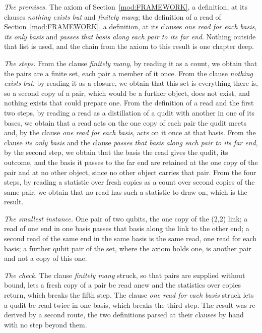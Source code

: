 \begin{chproof}[exact]
\textit{The premises.} The axiom of Section~\ref{mod:FRAMEWORK}, a definition, at its clauses \emph{nothing exists but} and \emph{finitely many}; the definition of a read of Section~\ref{mod:FRAMEWORK}, a definition, at its clauses \emph{one read for each basis}, \emph{its only basis} and \emph{passes that basis along each pair to its far end}. Nothing outside that list is used, and the chain from the axiom to this result is one chapter deep.

\textit{The steps.} From the clause \emph{finitely many}, by reading it as a count, we obtain that the pairs are a finite set, each pair a member of it once. From the clause \emph{nothing exists but}, by reading it as a closure, we obtain that this set is everything there is, so a second copy of a pair, which would be a further object, does not exist, and nothing exists that could prepare one. From the definition of a read and the first two steps, by reading a read as a distillation of a qudit with another in one of its bases, we obtain that a read acts on the one copy of each pair the qudit meets and, by the clause \emph{one read for each basis}, acts on it once at that basis. From the clause \emph{its only basis} and the clause \emph{passes that basis along each pair to its far end}, by the second step, we obtain that the basis the read gives the qudit, its outcome, and the basis it passes to the far end are retained at the one copy of the pair and at no other object, since no other object carries that pair. From the four steps, by reading a statistic over fresh copies as a count over second copies of the same pair, we obtain that no read has such a statistic to draw on, which is the result.

\textit{The smallest instance.} One pair of two qubits, the one copy of the (2,2) link; a read of one end in one basis passes that basis along the link to the other end; a second read of the same end in the same basis is the same read, one read for each basis; a further qubit pair of the set, where the axiom holds one, is another pair and not a copy of this one.

\textit{The check.} The clause \emph{finitely many} struck, so that pairs are supplied without bound, lets a fresh copy of a pair be read anew and the statistics over copies return, which breaks the fifth step. The clause \emph{one read for each basis} struck lets a qudit be read twice in one basis, which breaks the third step. The result was re-derived by a second route, the two definitions parsed at their clauses by hand with no step beyond them.
\end{chproof}
